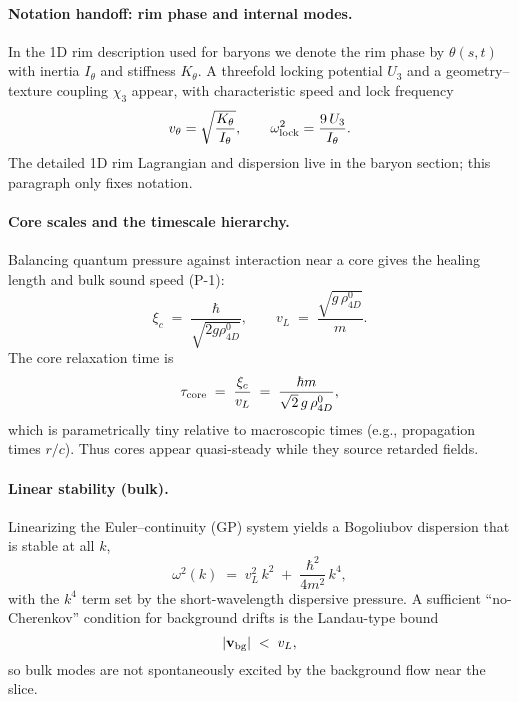 \paragraph*{Notation handoff: rim phase and internal modes.}
In the 1D rim description used for baryons we denote the rim phase by $\theta(s,t)$ with inertia $I_\theta$ and stiffness $K_\theta$. A threefold locking potential $U_3$ and a geometry–texture coupling $\chi_3$ appear, with characteristic speed and lock frequency
\[
v_\theta=\sqrt{\frac{K_\theta}{I_\theta}},\qquad \omega_{\rm lock}^2=\frac{9\,U_3}{I_\theta}.
\]
The detailed 1D rim Lagrangian and dispersion live in the baryon section; this paragraph only fixes notation.

\paragraph{Core scales and the timescale hierarchy.}
Balancing quantum pressure against interaction near a core gives the healing length and bulk sound speed (P-1):
\begin{equation}
\xi_c \;=\; \frac{\hbar}{\sqrt{2 g \rho_{4D}^0}},
\qquad
v_L \;=\; \frac{\sqrt{g\,\rho_{4D}^0}}{m}.
\end{equation}
The core relaxation time is
\begin{equation}
\tau_{\rm core} \;=\; \frac{\xi_c}{v_L} \;=\; \frac{\hbar m}{\sqrt{2}\,g\,\rho_{4D}^0},
\end{equation}
which is parametrically tiny relative to macroscopic times (e.g., propagation times $r/c$). Thus cores appear quasi-steady while they source retarded fields.

\paragraph{Linear stability (bulk).}
Linearizing the Euler–continuity (GP) system yields a Bogoliubov dispersion that is stable at all $k$,
\begin{equation}
\omega^2(k) \;=\; v_L^2\,k^2 \;+\; \frac{\hbar^2}{4m^2}\,k^4,
\end{equation}
with the $k^4$ term set by the short-wavelength dispersive pressure. A sufficient ``no-Cherenkov'' condition for background drifts is the Landau-type bound
\begin{equation}
|\mathbf v_{\rm bg}| \;<\; v_L,
\end{equation}
so bulk modes are not spontaneously excited by the background flow near the slice.

